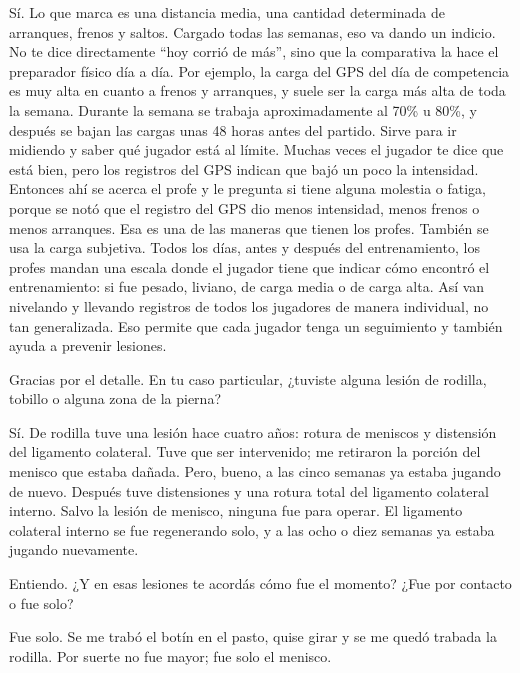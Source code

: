 \begin{description}[leftmargin=0pt, itemindent=\parindent, labelsep=0.5em, itemsep=0pt, parsep=0pt, topsep=0pt]
    \item[\textbf{Sebastián López:}] Sí. Lo que marca es una distancia media, una cantidad determinada de arranques, frenos y saltos. Cargado todas las semanas, eso va dando un indicio. No te dice directamente ``hoy corrió de más'', sino que la comparativa la hace el preparador físico día a día. Por ejemplo, la carga del GPS del día de competencia es muy alta en cuanto a frenos y arranques, y suele ser la carga más alta de toda la semana. Durante la semana se trabaja aproximadamente al 70\% u 80\%, y después se bajan las cargas unas 48 horas antes del partido. Sirve para ir midiendo y saber qué jugador está al límite. Muchas veces el jugador te dice que está bien, pero los registros del GPS indican que bajó un poco la intensidad. Entonces ahí se acerca el profe y le pregunta si tiene alguna molestia o fatiga, porque se notó que el registro del GPS dio menos intensidad, menos frenos o menos arranques. Esa es una de las maneras que tienen los profes. También se usa la carga subjetiva. Todos los días, antes y después del entrenamiento, los profes mandan una escala donde el jugador tiene que indicar cómo encontró el entrenamiento: si fue pesado, liviano, de carga media o de carga alta. Así van nivelando y llevando registros de todos los jugadores de manera individual, no tan generalizada. Eso permite que cada jugador tenga un seguimiento y también ayuda a prevenir lesiones.

    \item[\textbf{Entrevistador:}] Gracias por el detalle. En tu caso particular, ¿tuviste alguna lesión de rodilla, tobillo o alguna zona de la pierna?

    \item[\textbf{Sebastián López:}] Sí. De rodilla tuve una lesión hace cuatro años: rotura de meniscos y distensión del ligamento colateral. Tuve que ser intervenido; me retiraron la porción del menisco que estaba dañada. Pero, bueno, a las cinco semanas ya estaba jugando de nuevo. Después tuve distensiones y una rotura total del ligamento colateral interno. Salvo la lesión de menisco, ninguna fue para operar. El ligamento colateral interno se fue regenerando solo, y a las ocho o diez semanas ya estaba jugando nuevamente.

    \item[\textbf{Entrevistador:}] Entiendo. ¿Y en esas lesiones te acordás cómo fue el momento? ¿Fue por contacto o fue solo?

    \item[\textbf{Sebastián López:}] Fue solo. Se me trabó el botín en el pasto, quise girar y se me quedó trabada la rodilla. Por suerte no fue mayor; fue solo el menisco.


\end{description}
